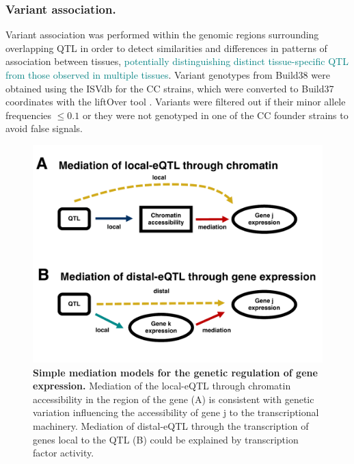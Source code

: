 \documentclass[9pt,twocolumn,twoside]{gsajnl}
\newcommand{\GKinline}[1]{\textcolor{teal}{#1}}
\begin{document}
\subsubsection{Variant association.}

Variant association was performed within the genomic regions surrounding overlapping QTL in order to detect similarities and differences in patterns of association between tissues, \GKinline{potentially distinguishing distinct tissue-specific QTL from those observed in multiple tissues}. Variant genotypes from Build38 were obtained using the ISVdb \citep{Oreper2017} for the CC strains, which were converted to Build37 coordinates with the liftOver tool \citep{Lawrence2009}. Variants were filtered out if their minor allele frequencies $\le 0.1$ or they were not genotyped in one of the CC founder strains to avoid false signals.

\begin{figure}[htbp]
\renewcommand{\familydefault}{\sfdefault}\normalfont
\centering
\includegraphics[width=\linewidth, clip, trim={0in 0.5in 0in 0in}]{figs/mediation_graph.pdf}
\caption{\textbf{Simple mediation models for the genetic regulation of gene expression.} Mediation of the local-eQTL through chromatin accessibility in the region of the gene (A) is consistent with genetic variation influencing the accessibility of gene j to the transcriptional machinery. Mediation of distal-eQTL through the transcription of genes local to the QTL (B) could be explained by transcription factor activity. 
\label{fig:graph}}
\end{figure}
\end{document}
